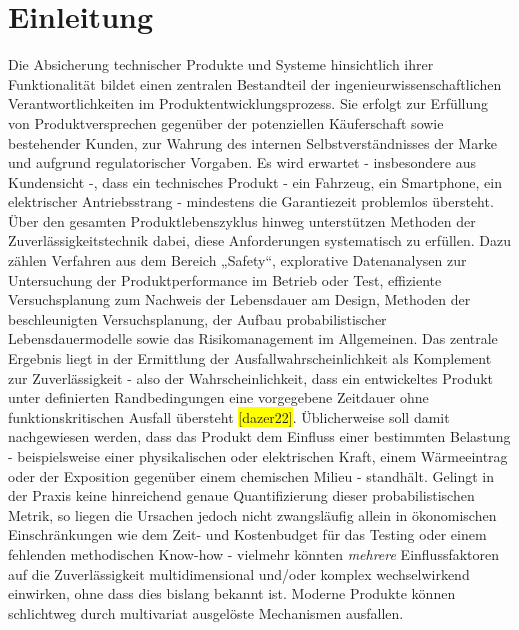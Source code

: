 
\chapter{Einleitung}
Die Absicherung technischer Produkte und Systeme hinsichtlich ihrer Funktionalität bildet einen zentralen Bestandteil der ingenieurwissenschaftlichen Verantwortlichkeiten im Produktentwicklungsprozess.
Sie erfolgt zur Erfüllung von Produktversprechen gegenüber der potenziellen Käuferschaft sowie bestehender Kunden, zur Wahrung des internen Selbstverständnisses der Marke und aufgrund regulatorischer Vorgaben.
Es wird erwartet - insbesondere aus Kundensicht -, dass ein technisches Produkt - ein Fahrzeug, ein Smartphone, ein elektrischer Antriebsstrang - mindestens die Garantiezeit problemlos übersteht.\\
Über den gesamten Produktlebenszyklus hinweg unterstützen Methoden der Zuverlässigkeitstechnik dabei, diese Anforderungen systematisch zu erfüllen.
Dazu zählen Verfahren aus dem Bereich „Safety“, explorative Datenanalysen zur Untersuchung der Produktperformance im Betrieb oder Test, effiziente Versuchsplanung zum Nachweis der Lebensdauer am Design, Methoden der beschleunigten Versuchsplanung, der Aufbau probabilistischer Lebensdauermodelle sowie das Risikomanagement im Allgemeinen.
Das zentrale Ergebnis liegt in der Ermittlung der Ausfallwahrscheinlichkeit als Komplement zur Zuverlässigkeit - also der Wahrscheinlichkeit, dass ein entwickeltes Produkt unter definierten Randbedingungen eine vorgegebene Zeitdauer ohne funktionskritischen Ausfall übersteht \colorbox{yellow}{[dazer22]}.
Üblicherweise soll damit nachgewiesen werden, dass das Produkt dem Einfluss einer bestimmten Belastung - beispielsweise einer physikalischen oder elektrischen Kraft, einem Wärmeeintrag oder der Exposition gegenüber einem chemischen Milieu - standhält.
Gelingt in der Praxis keine hinreichend genaue Quantifizierung dieser probabilistischen Metrik, so liegen die Ursachen jedoch nicht zwangsläufig allein in ökonomischen Einschränkungen wie dem Zeit- und Kostenbudget für das Testing oder einem fehlenden methodischen Know-how - vielmehr könnten  \textit{mehrere} Einflussfaktoren auf die Zuverlässigkeit multidimensional und/oder komplex wechselwirkend einwirken, ohne dass dies bislang bekannt ist.
Moderne Produkte können schlichtweg durch multivariat ausgelöste Mechanismen ausfallen.


